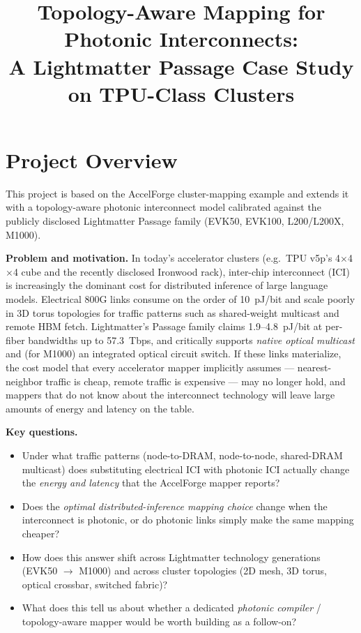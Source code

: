 \documentclass[conference,onecolumn]{IEEEtran}
\begin{document}
\title{Topology-Aware Mapping for Photonic Interconnects:\\
A Lightmatter Passage Case Study on TPU-Class Clusters}

\author{
\and
{}
}

\maketitle


\section{Project Overview}
This project is based on the AccelForge cluster-mapping example and extends it
with a topology-aware photonic interconnect model calibrated against the
publicly disclosed Lightmatter Passage family (EVK50, EVK100, L200/L200X, M1000).

\textbf{Problem and motivation.}
In today's accelerator clusters (e.g.\ TPU v5p's 4$\times$4$\times$4 cube and the
recently disclosed Ironwood rack), inter-chip interconnect (ICI) is increasingly
the dominant cost for distributed inference of large language models. Electrical
800G links consume on the order of 10~pJ/bit and scale poorly in 3D torus
topologies for traffic patterns such as shared-weight multicast and remote HBM
fetch. Lightmatter's Passage family claims 1.9--4.8~pJ/bit at per-fiber
bandwidths up to 57.3~Tbps, and critically supports \emph{native optical
multicast} and (for M1000) an integrated optical circuit switch.
If these links materialize, the cost model that every accelerator mapper
implicitly assumes --- nearest-neighbor traffic is cheap, remote traffic is
expensive --- may no longer hold, and mappers that do not know about the
interconnect technology will leave large amounts of energy and latency on the
table.

\textbf{Key questions.}
\begin{itemize}
    \item Under what traffic patterns (node-to-DRAM, node-to-node, shared-DRAM
    multicast) does substituting electrical ICI with photonic ICI actually
    change the \emph{energy and latency} that the AccelForge mapper reports?
    \item Does the \emph{optimal distributed-inference mapping choice} change
    when the interconnect is photonic, or do photonic links simply make the
    same mapping cheaper?
    \item How does this answer shift across Lightmatter technology generations
    (EVK50 $\rightarrow$ M1000) and across cluster topologies (2D mesh, 3D
    torus, optical crossbar, switched fabric)?
    \item What does this tell us about whether a dedicated \emph{photonic
    compiler} / topology-aware mapper would be worth building as a follow-on?
\end{itemize}
\end{document}
